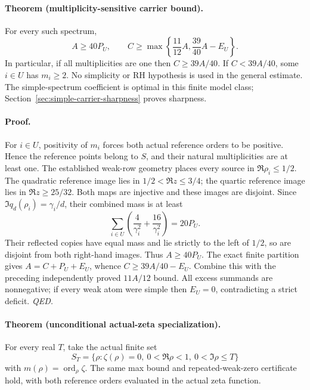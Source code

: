 \paragraph{Theorem (multiplicity-sensitive carrier bound).}
For every such spectrum,
\[
 A\ge40P_U,\qquad
 C\ge\max\left\{\frac{11}{12}A,\frac{39}{40}A-E_U\right\}.
\]
In particular, if all multiplicities are one then \(C\ge39A/40\).
If \(C<39A/40\), some \(i\in U\) has \(m_i\ge2\).
No simplicity or RH hypothesis is used in the general estimate.
The simple-spectrum coefficient is optimal in this finite model class;
Section~\ref{sec:simple-carrier-sharpness} proves sharpness.

\paragraph{Proof.}
For \(i\in U\), positivity of \(m_i\) forces both actual reference
orders to be positive. Hence the reference points belong to \(S\),
and their natural multiplicities are at least one. The established
weak-row geometry places every source in \(\Re\rho_i\le1/2\).
The quadratic reference image lies in \(1/2<\Re z\le3/4\);
the quartic reference image lies in \(\Re z\ge25/32\).
Both maps are injective and these images are disjoint.
Since \(\Im q_d(\rho_i)=\gamma_i/d\), their combined mass is at least
\[
 \sum_{i\in U}\left(\frac4{\gamma_i^2}
                         +\frac{16}{\gamma_i^2}\right)=20P_U.
\]
Their reflected copies have equal mass and lie strictly to the left
of \(1/2\), so are disjoint from both right-hand images. Thus
\(A\ge40P_U\). The exact finite partition gives
\(A=C+P_U+E_U\), whence \(C\ge39A/40-E_U\).
Combine this with the preceding independently proved \(11A/12\) bound.
All excess summands are nonnegative; if every weak atom were simple
then \(E_U=0\), contradicting a strict deficit.
\hfill\textit{QED.}

\paragraph{Theorem (unconditional actual-zeta specialization).}
For every real \(T\), take the actual finite set
\[
 S_T=\{\rho:\zeta(\rho)=0,\ 0<\Re\rho<1,\ 0<\Im\rho\le T\}
\]
with \(m(\rho)=\operatorname{ord}_{\rho}\zeta\).
The same max bound and repeated-weak-zero certificate hold, with both
reference orders evaluated in the actual zeta function.

